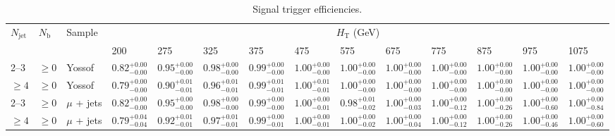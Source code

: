 \documentclass[]{article}
\begin{document}
\clearpage
\begin{landscape}
\begin{center}
\begin{table}[h!]
\caption{Signal trigger efficiencies.}
\centering
\scriptsize
\begin{tabular}{llllllllllllll}
\hline
\hline
$N_{\textrm{jet}}$ & $N_{\textrm{b}}$ & Sample & \multicolumn{11}{c}{$H_{\textrm{T}}$ (GeV)} \\
\cline{4-14}
 & & &  200 & 275 & 325 & 375 & 475 & 575 & 675 & 775 & 875 & 975 & 1075 \\
 \hline
 2--3 & $\geq 0$ & Yossof & $0.82^{+0.00}_{-0.00}$ & $0.95^{+0.00}_{-0.00}$ & $0.98^{+0.00}_{-0.00}$ & $0.99^{+0.00}_{-0.00}$ & $1.00^{+0.00}_{-0.00}$ & $1.00^{+0.00}_{-0.00}$ & $1.00^{+0.00}_{-0.00}$ & $1.00^{+0.00}_{-0.00}$ & $1.00^{+0.00}_{-0.00}$ & $1.00^{+0.00}_{-0.00}$ & $1.00^{+0.00}_{-0.00}$ \\
 $\geq 4$ & $\geq 0$ & Yossof & $0.79^{+0.00}_{-0.00}$ & $0.90^{+0.01}_{-0.01}$ & $0.96^{+0.01}_{-0.01}$ & $0.99^{+0.01}_{-0.01}$ & $1.00^{+0.01}_{-0.01}$ & $1.00^{+0.00}_{-0.00}$ & $1.00^{+0.00}_{-0.00}$ & $1.00^{+0.00}_{-0.00}$ & $1.00^{+0.00}_{-0.00}$ & $1.00^{+0.00}_{-0.00}$ & $1.00^{+0.00}_{-0.00}$ \\
 \hline
 2--3 & $\geq 0$ & $\mu$ + jets & $0.82^{+0.00}_{-0.00}$ & $0.95^{+0.00}_{-0.00}$ & $0.98^{+0.00}_{-0.00}$ & $0.99^{+0.00}_{-0.00}$ & $1.00^{+0.00}_{-0.01}$ & $0.98^{+0.01}_{-0.02}$ & $1.00^{+0.00}_{-0.03}$ & $1.00^{+0.00}_{-0.12}$ & $1.00^{+0.00}_{-0.26}$ & $1.00^{+0.00}_{-0.60}$ & $1.00^{+0.00}_{-0.84}$ \\
 $\geq 4$ & $\geq 0$ & $\mu$ + jets & $0.79^{+0.04}_{-0.04}$ & $0.92^{+0.01}_{-0.01}$ & $0.97^{+0.01}_{-0.01}$ & $0.99^{+0.00}_{-0.01}$ & $1.00^{+0.00}_{-0.01}$ & $1.00^{+0.00}_{-0.02}$ & $1.00^{+0.00}_{-0.04}$ & $1.00^{+0.00}_{-0.12}$ & $1.00^{+0.00}_{-0.26}$ & $1.00^{+0.00}_{-0.46}$ & $1.00^{+0.00}_{-0.60}$ \\
 \hline
 \hline
 \hline
 \end{tabular}
 \end{table}
 \end{center}
 \end{landscape}
 
\end{document}
